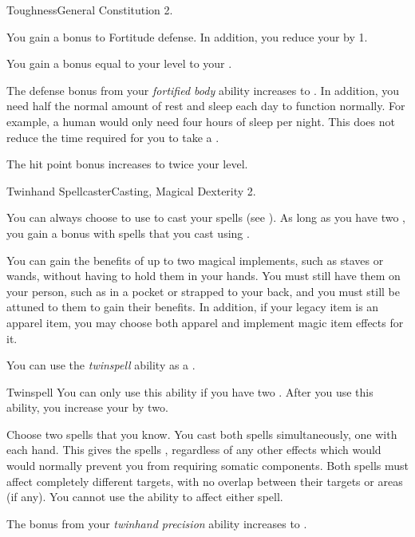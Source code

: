     \begin{feat}{Toughness}{General}
        \featpre Constitution 2.

         You gain a  bonus to Fortitude defense.
        In addition, you reduce your  by 1.

         You gain a bonus equal to your level to your .

         The defense bonus from your \textit{fortified body} ability increases to .
        In addition, you need half the normal amount of rest and sleep each day to function normally.
        For example, a human would only need four hours of sleep per night.
        This does not reduce the time required for you to take a .

         The hit point bonus increases to twice your level.
    \end{feat}

    \begin{magicalfeat}{Twinhand Spellcaster}{Casting, Magical}
        \featpre Dexterity 2.

         You can always choose to use  to cast your spells (see ).
        As long as you have two , you gain a   bonus with spells that you cast using .

         You can gain the benefits of up to two magical implements, such as staves or wands, without having to hold them in your hands.
        You must still have them on your person, such as in a pocket or strapped to your back, and you must still be attuned to them to gain their benefits.
        In addition, if your legacy item is an apparel item, you may choose both apparel and implement magic item effects for it.

         You can use the \textit{twinspell} ability as a .
        \begin{magicalactiveability}{Twinspell}
            \rankline
            You can only use this ability if you have two .
            After you use this ability, you increase your  by two.

            Choose two spells that you know.
            You cast both spells simultaneously, one with each hand.
            This gives the spells , regardless of any other effects which would would normally prevent you from requiring somatic components.
            Both spells must affect completely different targets, with no overlap between their targets or areas (if any).
            You cannot use the  ability to affect either spell.
        \end{magicalactiveability}

         The bonus from your \textit{twinhand precision} ability increases to .
    \end{magicalfeat}

